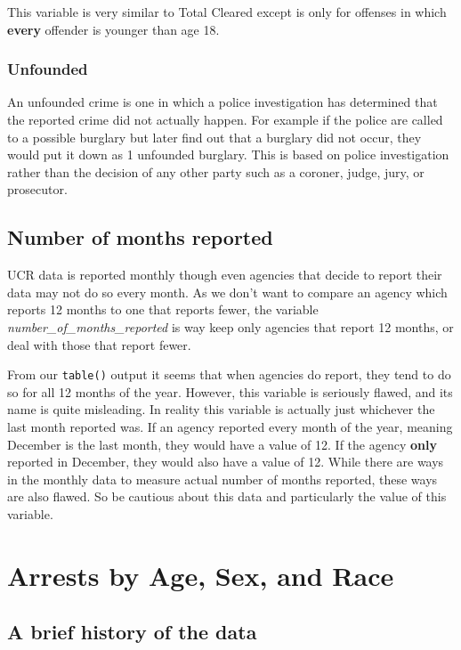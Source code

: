 \documentclass[
  12pt,
  openany]{book}
\begin{document}
This variable is very similar to Total Cleared except is only for offenses in which \textbf{every} offender is younger than age 18.

\hypertarget{unfounded}{%
\subsection{Unfounded}\label{unfounded}}

An unfounded crime is one in which a police investigation has determined that the reported crime did not actually happen. For example if the police are called to a possible burglary but later find out that a burglary did not occur, they would put it down as 1 unfounded burglary. This is based on police investigation rather than the decision of any other party such as a coroner, judge, jury, or prosecutor.

\hypertarget{number-of-months-reported}{%
\section{Number of months reported}\label{number-of-months-reported}}

UCR data is reported monthly though even agencies that decide to report their data may not do so every month. As we don't want to compare an agency which reports 12 months to one that reports fewer, the variable \emph{number\_of\_months\_reported} is way keep only agencies that report 12 months, or deal with those that report fewer.

From our \texttt{table()} output it seems that when agencies do report, they tend to do so for all 12 months of the year. However, this variable is seriously flawed, and its name is quite misleading. In reality this variable is actually just whichever the last month reported was. If an agency reported every month of the year, meaning December is the last month, they would have a value of 12. If the agency \textbf{only} reported in December, they would also have a value of 12. While there are ways in the monthly data to measure actual number of months reported, these ways are also flawed. So be cautious about this data and particularly the value of this variable.

\hypertarget{arrests}{%
\chapter{Arrests by Age, Sex, and Race}\label{arrests}}

\hypertarget{a-brief-history-of-the-data-1}{%
\section{A brief history of the data}\label{a-brief-history-of-the-data-1}}
\end{document}

